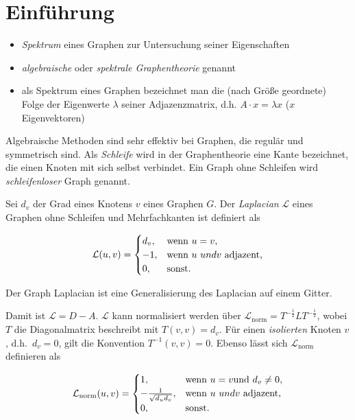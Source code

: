 \section{Einführung}

\begin{itemize}
  \item \emph{Spektrum} eines Graphen zur Untersuchung seiner Eigenschaften
  \item \emph{algebraische} oder \emph{spektrale Graphentheorie} genannt
  \item als Spektrum eines Graphen bezeichnet man die (nach Größe geordnete) Folge der Eigenwerte $\lambda$ seiner Adjazenzmatrix, d.h. $A \cdot x = \lambda x$ ($x$ Eigenvektoren)
\end{itemize}

Algebraische Methoden sind sehr effektiv bei Graphen, die regulär und symmetrisch sind.
Als \emph{Schleife} wird in der Graphentheorie eine Kante bezeichnet, die einen Knoten mit sich selbst verbindet.
Ein Graph ohne Schleifen wird \emph{schleifenloser} Graph genannt.

Sei $d_v$ der Grad eines Knotens $v$ eines Graphen $G$.
Der \emph{Laplacian} $\mathcal{L}$ eines Graphen ohne Schleifen und Mehrfachkanten ist definiert als

\begin{equation}
  \mathcal{L}(u, v) = \begin{cases}
    d_v, & \text{wenn }u = v\text{,}\\
    -1, & \text{wenn }u\text\ {und }v\ \text{adjazent,}\\
    0, & \text{sonst.}
  \end{cases}
\end{equation}

Der Graph Laplacian ist eine Generalisierung des Laplacian auf einem Gitter.

Damit ist $\mathcal{L} = D - A$.
$\mathcal{L}$ kann normalisiert werden über $\mathcal{L}_{\text{norm}} = T^{-\frac{1}{2}}LT^{-\frac{1}{2}}$, wobei $T$ die Diagonalmatrix beschreibt mit $T(v, v) = d_v$.
Für einen \emph{isolierten} Knoten $v$, d.h.\ $d_v = 0$, gilt die Konvention $T^{-1}(v, v) = 0$.
Ebenso lässt sich $\mathcal{L}_{\text{norm}}$ definieren als

\begin{equation}
  \mathcal{L}_{\text{norm}}(u, v) = \begin{cases}
    1, & \text{wenn }u = v\text{und }d_v \neq 0\text{,}\\
    -\frac{1}{\sqrt{d_u d_v}}, & \text{wenn }u\text\ {und }v\ \text{adjazent,}\\
    0, & \text{sonst.}
  \end{cases}
\end{equation}

